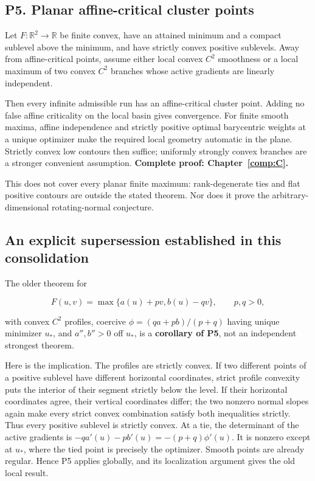

\subsection{P5. Planar affine-critical cluster points}\label{p5.-planar-affine-critical-cluster-points}

Let \(F:\mathbb R^2\to\mathbb R\) be finite convex, have an attained minimum and a compact sublevel above the minimum, and have strictly convex positive sublevels. Away from affine-critical points, assume either local convex \(C^2\) smoothness or a local maximum of two convex \(C^2\) branches whose active gradients are linearly independent.

Then every infinite admissible run has an affine-critical cluster point. Adding no false affine criticality on the local basin gives convergence. For finite smooth maxima, affine independence and strictly positive optimal barycentric weights at a unique optimizer make the required local geometry automatic in the plane. Strictly convex low contours then suffice; uniformly strongly convex branches are a stronger convenient assumption. \textbf{Complete proof: Chapter~\ref{comp:C}.}

This does not cover every planar finite maximum: rank-degenerate ties and flat positive contours are outside the stated theorem. Nor does it prove the arbitrary-dimensional rotating-normal conjecture.



\subsection{An explicit supersession established in this consolidation}\label{an-explicit-supersession-established-in-this-consolidation}

The older theorem for

\[F(u,v)=\max\{a(u)+pv,b(u)-qv\},\qquad p,q>0,\]

with convex \(C^2\) profiles, coercive \(\phi=(qa+pb)/(p+q)\) having unique minimizer \(u_*\), and \(a'',b''>0\) off \(u_*\), is a \textbf{corollary of P5}, not an independent strongest theorem.

Here is the implication. The profiles are strictly convex. If two different points of a positive sublevel have different horizontal coordinates, strict profile convexity puts the interior of their segment strictly below the level. If their horizontal coordinates agree, their vertical coordinates differ; the two nonzero normal slopes again make every strict convex combination satisfy both inequalities strictly. Thus every positive sublevel is strictly convex. At a tie, the determinant of the active gradients is \(-qa'(u)-pb'(u)=-(p+q)\phi'(u)\). It is nonzero except at \(u_*\), where the tied point is precisely the optimizer. Smooth points are already regular. Hence P5 applies globally, and its localization argument gives the old local result.


